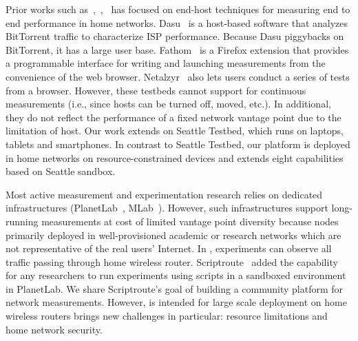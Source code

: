 Prior works such as~\cite{sanchez2014measurement},~\cite{dhawan2012fathom},~\cite{kreibich2010netalyzr} has focused on end-host techniques for measuring end to end performance in home networks. Dasu~\cite{sanchez2014measurement} is a host-based software that analyzes BitTorrent traffic to characterize ISP performance. Because Dasu piggybacks on BitTorrent, it has a large user base. Fathom~\cite{dhawan2012fathom} is a Firefox extension that provides a programmable interface for writing and launching measurements from the convenience of the web browser. Netalzyr~\cite{kreibich2010netalyzr} also lets users conduct a series of tests from a browser. However, these testbeds cannot support for continuous measurements (i.e., since hosts can be turned off, moved, etc.). In additional, they do not reflect the performance of a fixed network vantage point due to the limitation of host. Our work extends on Seattle Testbed\cite{cappos2009seattle}, which runs on laptops, tablets and smartphones. In contrast to Seattle Testbed, our platform is deployed in home networks on resource-constrained devices and extends eight capabilities based on Seattle sandbox.

Most active measurement and experimentation research relies on dedicated infrastructures (PlanetLab~\cite{chun2003planetlab}, MLab~\cite{mlab}). However, such infrastructures support long-running measurements at cost of limited vantage point diversity because nodes primarily deployed in well-provisioned academic or research networks which are not representative of the real users' Internet. In \sysname, experiments can observe all traffic passing through home wireless router. Scriptroute~\cite{spring2003scriptroute} added the capability for any researchers to run experiments using scripts in a sandboxed environment in PlanetLab. We share Scriptroute's goal of building a community platform for network measurements. However, \sysname is intended for large scale deployment on home wireless routers brings new challenges in particular: resource limitations and home network security.

